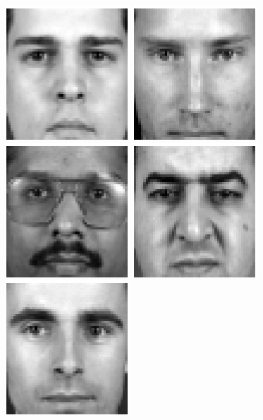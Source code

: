 \begin{figure}[ht]
\begin{center}
\includegraphics[scale=0.12]{ch4/figures/XM2VTS_1.png}
\includegraphics[scale=0.12]{ch4/figures/XM2VTS_2.png}
\includegraphics[scale=0.12]{ch4/figures/XM2VTS_3.png}
\includegraphics[scale=0.12]{ch4/figures/XM2VTS_4.png}
\includegraphics[scale=0.12]{ch4/figures/XM2VTS_5.png}

\end{center}
\end{figure}
